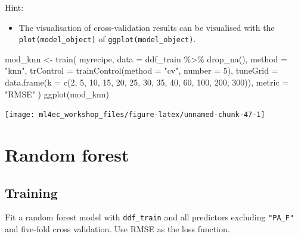 \documentclass[
]{book}
\newenvironment{Shaded}{\begin{snugshade}}{\end{snugshade}}
\newcommand{\AttributeTok}[1]{\textcolor[rgb]{0.77,0.63,0.00}{#1}}
\newcommand{\DecValTok}[1]{\textcolor[rgb]{0.00,0.00,0.81}{#1}}
\newcommand{\FunctionTok}[1]{\textcolor[rgb]{0.00,0.00,0.00}{#1}}
\newcommand{\NormalTok}[1]{#1}
\newcommand{\OtherTok}[1]{\textcolor[rgb]{0.56,0.35,0.01}{#1}}
\newcommand{\SpecialCharTok}[1]{\textcolor[rgb]{0.00,0.00,0.00}{#1}}
\newcommand{\StringTok}[1]{\textcolor[rgb]{0.31,0.60,0.02}{#1}}
\providecommand{\tightlist}{%
  \setlength{\itemsep}{0pt}\setlength{\parskip}{0pt}}
\begin{document}
Hint:

\begin{itemize}
\tightlist
\item
  The visualisation of cross-validation results can be visualised with the \texttt{plot(model\_object)} of \texttt{ggplot(model\_object)}.
\end{itemize}

\begin{Shaded}
\begin{Highlighting}[]
\NormalTok{mod\_knn }\OtherTok{\textless{}{-}} \FunctionTok{train}\NormalTok{(}
\NormalTok{  myrecipe, }
  \AttributeTok{data =}\NormalTok{ ddf\_train }\SpecialCharTok{\%\textgreater{}\%} 
    \FunctionTok{drop\_na}\NormalTok{(), }
  \AttributeTok{method =} \StringTok{"knn"}\NormalTok{,}
  \AttributeTok{trControl =} \FunctionTok{trainControl}\NormalTok{(}\AttributeTok{method =} \StringTok{"cv"}\NormalTok{, }\AttributeTok{number =} \DecValTok{5}\NormalTok{),}
  \AttributeTok{tuneGrid =} \FunctionTok{data.frame}\NormalTok{(}\AttributeTok{k =} \FunctionTok{c}\NormalTok{(}\DecValTok{2}\NormalTok{, }\DecValTok{5}\NormalTok{, }\DecValTok{10}\NormalTok{, }\DecValTok{15}\NormalTok{, }\DecValTok{20}\NormalTok{, }\DecValTok{25}\NormalTok{, }\DecValTok{30}\NormalTok{, }\DecValTok{35}\NormalTok{, }\DecValTok{40}\NormalTok{, }\DecValTok{60}\NormalTok{, }\DecValTok{100}\NormalTok{, }\DecValTok{200}\NormalTok{, }\DecValTok{300}\NormalTok{)),}
  \AttributeTok{metric =} \StringTok{"RMSE"}
\NormalTok{  )}
\FunctionTok{ggplot}\NormalTok{(mod\_knn)}
\end{Highlighting}
\end{Shaded}

\begin{center}\texttt{[image: ml4ec\_workshop\_files/figure-latex/unnamed-chunk-47-1]} \end{center}

\hypertarget{random-forest-2}{%
\section{Random forest}\label{random-forest-2}}

\hypertarget{training-6}{%
\subsection{Training}\label{training-6}}

Fit a random forest model with \texttt{ddf\_train} and all predictors excluding \texttt{"PA\_F"} and five-fold cross validation. Use RMSE as the loss function.
\end{document}

